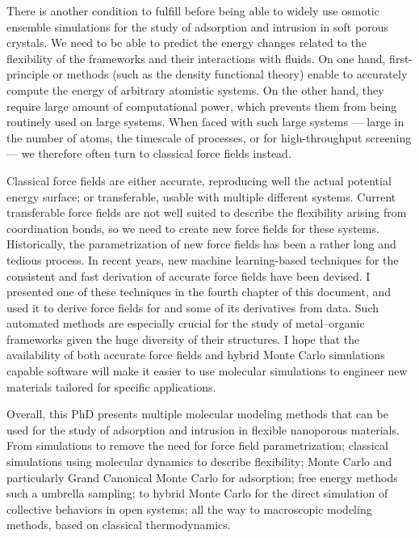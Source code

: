 There is another condition to fulfill before being able to widely use osmotic
ensemble simulations for the study of adsorption and intrusion in soft porous
crystals. We need to be able to predict the energy changes related to the
flexibility of the frameworks and their interactions with fluids. On one hand,
first-principle or \abinitio methods (such as the density functional theory)
enable to accurately compute the energy of arbitrary atomistic systems. On the
other hand, they require large amount of computational power, which prevents
them from being routinely used on large systems. When faced with such large
systems --- large in the number of atoms, the timescale of processes, or for
high-throughput screening --- we therefore often turn to classical force fields
instead.

Classical force fields are either accurate, \ie reproducing well the actual
potential energy surface; or transferable, \ie usable with multiple different
systems. Current transferable force fields are not well suited to describe the
flexibility arising from coordination bonds, so we need to create new force
fields for these systems. Historically, the parametrization of new force fields
has been a rather long and tedious process. In recent years, new machine
learning-based techniques for the consistent and fast derivation of accurate
force fields have been devised. I presented one of these techniques in the
fourth chapter of this document, and used it to derive force fields for 
and some of its derivatives from \abinitio data. Such automated methods are
especially crucial for the study of metal--organic frameworks given the huge
diversity of their structures. I hope that the availability of both accurate
force fields and hybrid Monte Carlo simulations capable software will make it
easier to use molecular simulations to engineer new materials tailored for
specific applications.

Overall, this PhD presents multiple molecular modeling methods that can be used
for the study of adsorption and intrusion in flexible nanoporous materials. From
\abinitio simulations to remove the need for force field parametrization;
classical simulations using molecular dynamics to describe flexibility; Monte
Carlo and particularly Grand Canonical Monte Carlo for adsorption; free energy
methods such a umbrella sampling; to hybrid Monte Carlo for the direct
simulation of collective behaviors in open systems; all the way to macroscopic
modeling methods, based on classical thermodynamics.


